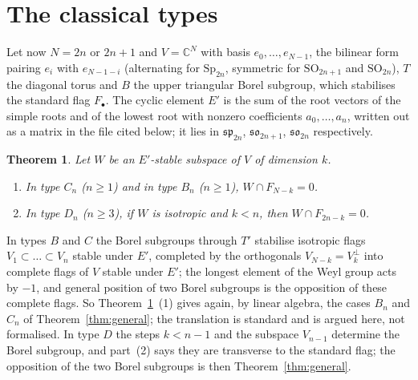\documentclass[11pt,a4paper]{amsart}
\newtheorem{theorem}{Theorem}[section]
\theoremstyle{definition}
\theoremstyle{remark}
\newcommand{\C}{\mathbb C}
\begin{document}
\section{The classical types}\label{sec:classical}

Let now $N = 2n$ or $2n+1$ and $V = \C^N$ with basis $e_0,\dots,e_{N-1}$, the bilinear form pairing $e_i$ with $e_{N-1-i}$ (alternating for $\mathrm{Sp}_{2n}$, symmetric for $\mathrm{SO}_{2n+1}$ and $\mathrm{SO}_{2n}$), $T$ the diagonal torus and $B$ the upper triangular Borel subgroup, which stabilises the standard flag $F_\bullet$. The cyclic element $E'$ is the sum of the root vectors of the simple roots and of the lowest root with nonzero coefficients $a_0,\dots,a_n$, written out as a matrix in the file cited below; it lies in $\mathfrak{sp}_{2n}$, $\mathfrak{so}_{2n+1}$, $\mathfrak{so}_{2n}$ respectively.

\begin{theorem}\label{thm:classical}
Let $W$ be an $E'$-stable subspace of $V$ of dimension $k$.
\begin{enumerate}
\item In type $C_n$ ($n \geq 1$) and in type $B_n$ ($n \geq 1$), $W \cap F_{N-k} = 0$.
\item In type $D_n$ ($n \geq 3$), if $W$ is isotropic and $k < n$, then $W \cap F_{2n-k} = 0$.
\end{enumerate}
\end{theorem}

In types $B$ and $C$ the Borel subgroups through $T'$ stabilise isotropic flags $V_1 \subset \dots \subset V_n$ stable under $E'$, completed by the orthogonals $V_{N-k} = V_k^{\perp}$ into complete flags of $V$ stable under $E'$; the longest element of the Weyl group acts by $-1$, and general position of two Borel subgroups is the opposition of these complete flags. So Theorem~\ref{thm:classical}~(1) gives again, by linear algebra, the cases $B_n$ and $C_n$ of Theorem~\ref{thm:general}; the translation is standard and is argued here, not formalised. In type $D$ the steps $k < n-1$ and the subspace $V_{n-1}$ determine the Borel subgroup, and part~(2) says they are transverse to the standard flag; the opposition of the two Borel subgroups is then Theorem~\ref{thm:general}.
\end{document}
